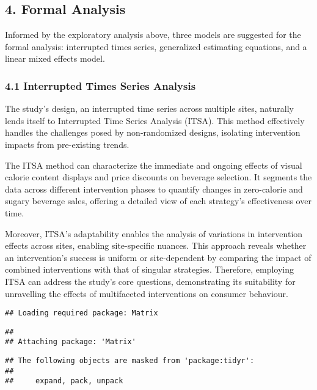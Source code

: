\documentclass[
]{article}
\begin{document}
\hypertarget{formal-analysis}{%
\subsection{4. Formal Analysis}\label{formal-analysis}}

Informed by the exploratory analysis above, three models are suggested
for the formal analysis: interrupted times series, generalized
estimating equations, and a linear mixed effects model.

\hypertarget{interrupted-times-series-analysis}{%
\subsubsection{4.1 Interrupted Times Series
Analysis}\label{interrupted-times-series-analysis}}

The study's design, an interrupted time series across multiple sites,
naturally lends itself to Interrupted Time Series Analysis (ITSA). This
method effectively handles the challenges posed by non-randomized
designs, isolating intervention impacts from pre-existing trends.

The ITSA method can characterize the immediate and ongoing effects of
visual calorie content displays and price discounts on beverage
selection. It segments the data across different intervention phases to
quantify changes in zero-calorie and sugary beverage sales, offering a
detailed view of each strategy's effectiveness over time.

Moreover, ITSA's adaptability enables the analysis of variations in
intervention effects across sites, enabling site-specific nuances. This
approach reveals whether an intervention's success is uniform or
site-dependent by comparing the impact of combined interventions with
that of singular strategies. Therefore, employing ITSA can address the
study's core questions, demonstrating its suitability for unravelling
the effects of multifaceted interventions on consumer behaviour.

\begin{verbatim}
## Loading required package: Matrix
\end{verbatim}

\begin{verbatim}
## 
## Attaching package: 'Matrix'
\end{verbatim}

\begin{verbatim}
## The following objects are masked from 'package:tidyr':
## 
##     expand, pack, unpack
\end{verbatim}
\end{document}
